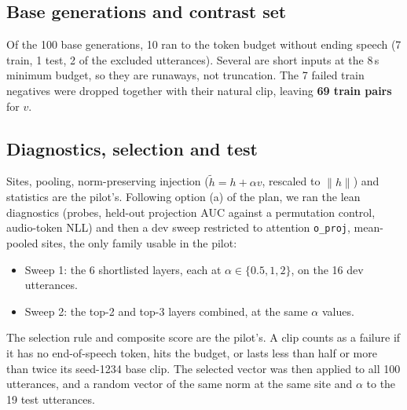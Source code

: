 \documentclass[11pt]{article}
\begin{document}
\subsection{Base generations and contrast set}
Of the 100 base generations, 10 ran to the token budget without ending speech (7 train, 1 test, 2 of the excluded utterances). Several are short inputs at the 8\,s minimum budget, so they are runaways, not truncation. The 7 failed train negatives were dropped together with their natural clip, leaving \textbf{69 train pairs} for $v$.

\subsection{Diagnostics, selection and test}
Sites, pooling, norm-preserving injection ($\tilde h=h+\alpha v$, rescaled to $\|h\|$) and statistics are the pilot's. Following option (a) of the plan, we ran the lean diagnostics (probes, held-out projection AUC against a permutation control, audio-token NLL) and then a dev sweep restricted to attention \texttt{o\_proj}, mean-pooled sites, the only family usable in the pilot:
\begin{itemize}
\item Sweep 1: the 6 shortlisted layers, each at $\alpha\in\{0.5,1,2\}$, on the 16 dev utterances.
\item Sweep 2: the top-2 and top-3 layers combined, at the same $\alpha$ values.
\end{itemize}
The selection rule and composite score are the pilot's. A clip counts as a failure if it has no end-of-speech token, hits the budget, or lasts less than half or more than twice its seed-1234 base clip. The selected vector was then applied to all 100 utterances, and a random vector of the same norm at the same site and $\alpha$ to the 19 test utterances.
\end{document}
